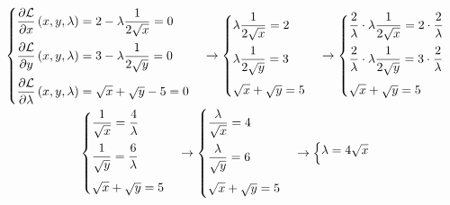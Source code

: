 \documentclass[a4paper]{article}
\begin{document}
	\begin{gather*}
		\begin{cases}
			\dfrac{\partial \mathcal{L}}{\partial x}\left(x,y,\lambda\right) = 2 - \lambda\dfrac{1}{2\sqrt{x}} = 0 \vspace{.5em} \\
			\dfrac{\partial \mathcal{L}}{\partial y}\left(x,y,\lambda\right) = 3 - \lambda\dfrac{1}{2\sqrt{y}} = 0 \vspace{.5em} \\
			\dfrac{\partial \mathcal{L}}{\partial \lambda}\left(x,y,\lambda\right) = \sqrt{x}+\sqrt{y}-5 = 0
		\end{cases}
		\rightarrow
		\begin{cases}
			\lambda\dfrac{1}{2\sqrt{x}} = 2 \vspace{.5em} \\
			\lambda\dfrac{1}{2\sqrt{y}} = 3 \vspace{.5em} \\
			\sqrt{x}+\sqrt{y} = 5
		\end{cases}
		\rightarrow
		\begin{cases}
			\dfrac{2}{\lambda} \cdot \lambda\dfrac{1}{2\sqrt{x}} = 2 \cdot \dfrac{2}{\lambda} \vspace{.5em} \\
			\dfrac{2}{\lambda} \cdot \lambda\dfrac{1}{2\sqrt{y}} = 3 \cdot \dfrac{2}{\lambda} \vspace{.5em} \\
			\sqrt{x}+\sqrt{y} = 5
		\end{cases}
		\\
		\begin{cases}
			\dfrac{1}{\sqrt{x}} = \dfrac{4}{\lambda} \vspace{.5em} \\
			\dfrac{1}{\sqrt{y}} = \dfrac{6}{\lambda} \vspace{.5em} \\
			\sqrt{x}+\sqrt{y} = 5
		\end{cases}
		\rightarrow
		\begin{cases}
			\dfrac{\lambda}{\sqrt{x}} = 4 \vspace{.5em} \\
			\dfrac{\lambda}{\sqrt{y}} = 6 \vspace{.5em} \\
			\sqrt{x}+\sqrt{y} = 5
		\end{cases}
		\rightarrow
		\begin{cases}
			\lambda = 4\sqrt{x} \vspace{.5em} \\

\end{cases}
\end{gather*}
\end{document}
